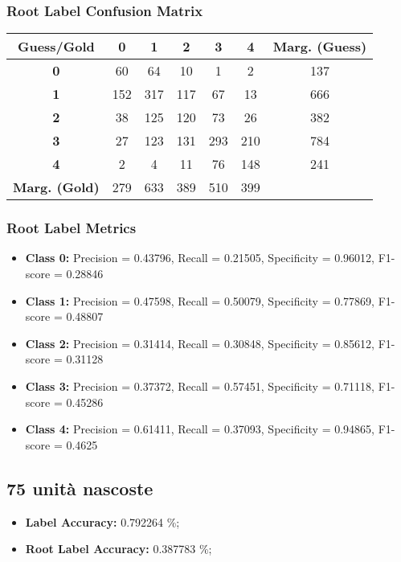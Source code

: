\subsubsection{Root Label Confusion Matrix}
\begin{table}[h]
\centering
\begin{tabular}{c|ccccc|c}
\textbf{Guess/Gold} & \textbf{0} & \textbf{1} & \textbf{2} & \textbf{3} & \textbf{4} & \textbf{Marg. (Guess)} \\
\hline
\textbf{0} & 60 & 64 & 10 & 1 & 2 & 137 \\
\textbf{1} & 152 & 317 & 117 & 67 & 13 & 666 \\
\textbf{2} & 38 & 125 & 120 & 73 & 26 & 382 \\
\textbf{3} & 27 & 123 & 131 & 293 & 210 & 784 \\
\textbf{4} & 2 & 4 & 11 & 76 & 148 & 241 \\
\hline
\textbf{Marg. (Gold)} & 279 & 633 & 389 & 510 & 399 & \\
\end{tabular}
\end{table}

\subsubsection{Root Label Metrics}
\begin{itemize}
    \item \textbf{Class 0:} Precision = 0.43796, Recall = 0.21505, Specificity = 0.96012, F1-score = 0.28846
    \item \textbf{Class 1:} Precision = 0.47598, Recall = 0.50079, Specificity = 0.77869, F1-score = 0.48807
    \item \textbf{Class 2:} Precision = 0.31414, Recall = 0.30848, Specificity = 0.85612, F1-score = 0.31128
    \item \textbf{Class 3:} Precision = 0.37372, Recall = 0.57451, Specificity = 0.71118, F1-score = 0.45286
    \item \textbf{Class 4:} Precision = 0.61411, Recall = 0.37093, Specificity = 0.94865, F1-score = 0.4625
\end{itemize}

\subsection{75 unità nascoste}

\begin{itemize}
    \item \textbf{Label Accuracy:} 0.792264 \%;
    \item \textbf{Root Label Accuracy:} 0.387783 \%;
\end{itemize}

